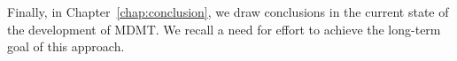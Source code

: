 Finally, in Chapter~\ref{chap:conclusion}, we draw conclusions in the current state of the development of MDMT. We recall a need for effort to achieve the long-term goal of this approach.















































































